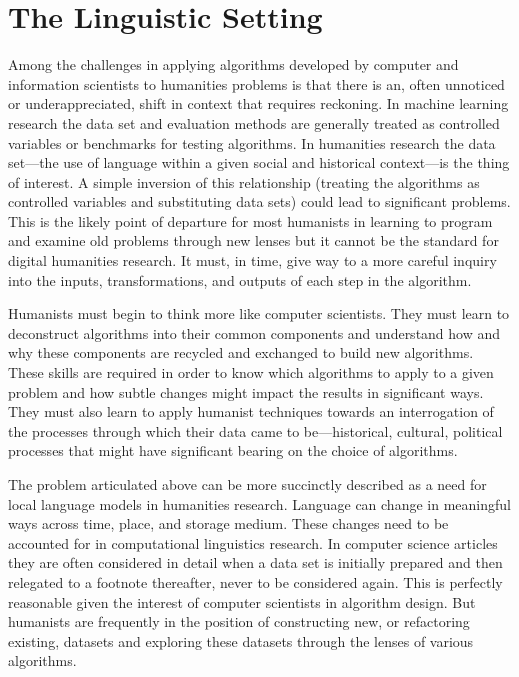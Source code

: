\documentclass[12pt, oneside]{report}
\begin{document}
\chapter{The Linguistic Setting}
\par
Among the challenges in applying algorithms developed by computer and information scientists to humanities problems is that there is an, often unnoticed or underappreciated, shift in context that requires reckoning.
In machine learning research the data set and evaluation methods are generally treated as controlled variables or benchmarks for testing algorithms.
In humanities research the data set---the use of language within a given social and historical context---is the thing of interest.
A simple inversion of this relationship (treating the algorithms as controlled variables and substituting data sets) could lead to significant problems.
This is the likely point of departure for most humanists in learning to program and examine old problems through new lenses but it cannot be the standard for digital humanities research.
It must, in time, give way to a more careful inquiry into the inputs, transformations, and outputs of each step in the algorithm.
\par
Humanists must begin to think more like computer scientists.
They must learn to deconstruct algorithms into their common components and understand how and why these components are recycled and exchanged to build new algorithms.
These skills are required in order to know which algorithms to apply to a given problem and how subtle changes might impact the results in significant ways.
They must also learn to apply humanist techniques towards an interrogation of the processes through which their data came to be---historical, cultural, political processes that might have significant bearing on the choice of algorithms.
\par
The problem articulated above can be more succinctly described as a need for local language models in humanities research.
Language can change in meaningful ways across time, place, and storage medium.
These changes need to be accounted for in computational linguistics research.
In computer science articles they are often considered in detail when a data set is initially prepared and then relegated to a footnote thereafter, never to be considered again.
This is perfectly reasonable given the interest of computer scientists in algorithm design.
But humanists are frequently in the position of constructing new, or refactoring existing, datasets and exploring these datasets through the lenses of various algorithms.
\end{document}
